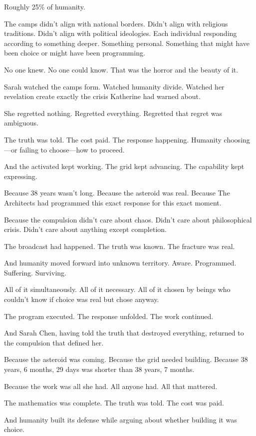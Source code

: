 Roughly 25\% of humanity.

The camps didn't align with national borders. Didn't align with religious traditions. Didn't align with political ideologies. Each individual responding according to something deeper. Something personal. Something that might have been choice or might have been programming.

No one knew. No one could know. That was the horror and the beauty of it.

Sarah watched the camps form. Watched humanity divide. Watched her revelation create exactly the crisis Katherine had warned about.

She regretted nothing. Regretted everything. Regretted that regret was ambiguous.

The truth was told. The cost paid. The response happening. Humanity choosing—or failing to choose—how to proceed.

And the activated kept working. The grid kept advancing. The capability kept expressing.

Because 38 years wasn't long. Because the asteroid was real. Because The Architects had programmed this exact response for this exact moment.

Because the compulsion didn't care about chaos. Didn't care about philosophical crisis. Didn't care about anything except completion.

The broadcast had happened. The truth was known. The fracture was real.

And humanity moved forward into unknown territory. Aware. Programmed. Suffering. Surviving.

All of it simultaneously. All of it necessary. All of it chosen by beings who couldn't know if choice was real but chose anyway.

The program executed. The response unfolded. The work continued.

And Sarah Chen, having told the truth that destroyed everything, returned to the compulsion that defined her.

Because the asteroid was coming. Because the grid needed building. Because 38 years, 6 months, 29 days was shorter than 38 years, 7 months.

Because the work was all she had. All anyone had. All that mattered.

The mathematics was complete. The truth was told. The cost was paid.

And humanity built its defense while arguing about whether building it was choice.


